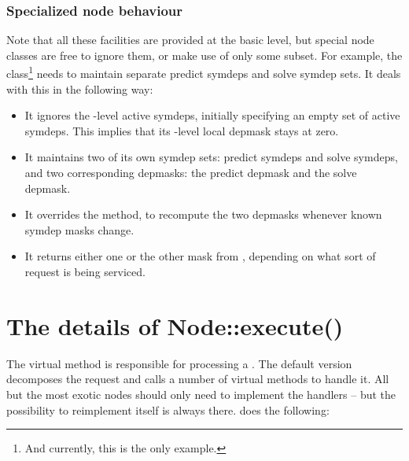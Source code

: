 \documentclass[10pt,twoside]{book}
\begin{document}
\subsection{Specialized node behaviour}  
  
  Note that all these facilities are provided at the basic  level, but
  special node classes are free to ignore them, or make use of only some
  subset. For example, the  class\footnote{And currently, this is the
  only example.} needs to maintain separate predict symdeps and solve symdep
  sets. It deals with this in the following way:

  \begin{itemize}
  
  \item It ignores the -level active symdeps, initially specifying an
    empty set of active symdeps. This implies that its -level local
    depmask stays at zero.

  \item It maintains two of its own symdep sets: predict symdeps and solve
    symdeps, and two corresponding depmasks: the predict depmask and the solve
    depmask.
    
  \item It overrides the  method, to recompute the two
    depmasks whenever known symdep masks change.
    
  \item It returns either one or the other mask from , depending
    on what sort of request is being serviced.

  \end{itemize}
  
\chapter{The details of Node::execute()}

  The virtual  method is responsible for processing a
  \Request. The default version decomposes the request and calls a number of
  virtual methods to handle it. All but the most exotic nodes should only need
  to implement the handlers -- but the possibility to reimplement
   itself is always there.  does the
  following:
\end{document}
